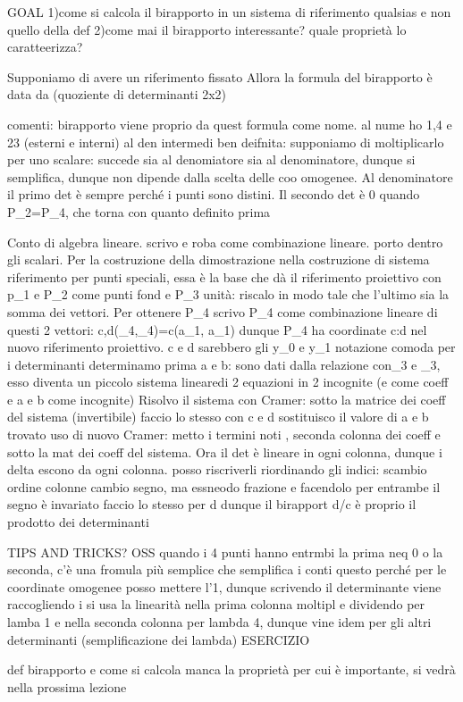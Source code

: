 GOAL
1)come si calcola il birapporto in un sistema di riferimento qualsias e non quello della def
2)come mai il birapporto  interessante? quale proprietà lo caratteerizza?

\begin{theorema}
	Supponiamo di avere un riferimento fissato
	Allora la formula del birapporto è data da (quoziente di determinanti 2x2)
\end{theorema}
comenti: birapporto viene proprio da quest formula come nome. al nume ho 1,4 e 23 (esterni e interni) al den intermedi
ben deifnita: supponiamo di moltiplicarlo per uno scalare: succede sia al denomiatore sia al denominatore, dunque si semplifica, dunque non dipende dalla scelta delle coo omogenee. Al denominatore il primo det è sempre  perché i punti sono distini. Il secondo det è 0 quando P_2=P_4, che torna con quanto definito prima
\begin{demonstration}
	Conto di algebra lineare.
	scrivo \lambda e roba come combinazione lineare. porto dentro gli scalari. Per la costruzione della dimostrazione nella costruzione di sistema riferimento per punti speciali, essa è la base che dà il riferimento proiettivo con p_1 e P_2 come punti fond e P_3 unità: riscalo in modo tale che l'ultimo sia la somma dei vettori. Per ottenere P_4 scrivo P_4 come combinazione lineare di questi 2 vettori: \exists c,d\in\kap (\lambda_4,\mu_4)=c(a\lmbda_1, a\mu_1)
	dunque P_4 ha coordinate c:d nel nuovo riferimento proiettivo. c e d sarebbero gli y_0 e y_1
	notazione comoda per i determinanti
	determinamo prima a e b: sono dati dalla relazione con\lambda_3 e \mu_3, esso diventa un piccolo sistema linearedi 2 equazioni in 2 incognite (\lambda e \mu come coeff e a e b come incognite) Risolvo il sistema con Cramer: sotto la matrice dei coeff del sistema (invertibile) 
	faccio lo stesso con c e d
	sostituisco il valore di a e b trovato
	uso di nuovo Cramer: metto i termini noti , seconda colonna dei coeff e sotto la mat dei coeff del sistema. Ora il det è lineare in ogni colonna, dunque i delta escono da ogni colonna. posso riscriverli riordinando gli indici: scambio ordine colonne cambio segno, ma essneodo frazione e facendolo per entrambe il segno è invariato
	faccio lo stesso per d
	dunque il birapport d/c è proprio il prodotto dei determinanti
\end{demonstration}

TIPS AND TRICKS?
OSS quando i 4 punti hanno entrmbi la prima neq 0 o la seconda, c'è una fromula più semplice che semplifica i conti
questo perché per le coordinate omogenee posso mettere l'1, dunque scrivendo il determinante viene raccogliendo i \lambda 
si usa la linearità nella prima colonna moltipl e dividendo per lamba 1 e nella seconda colonna per lambda 4, dunque vine
idem per gli altri determinanti (semplificazione dei lambda)
ESERCIZIO



def birapporto e come si calcola
manca la proprietà per cui è importante, si vedrà nella prossima lezione

